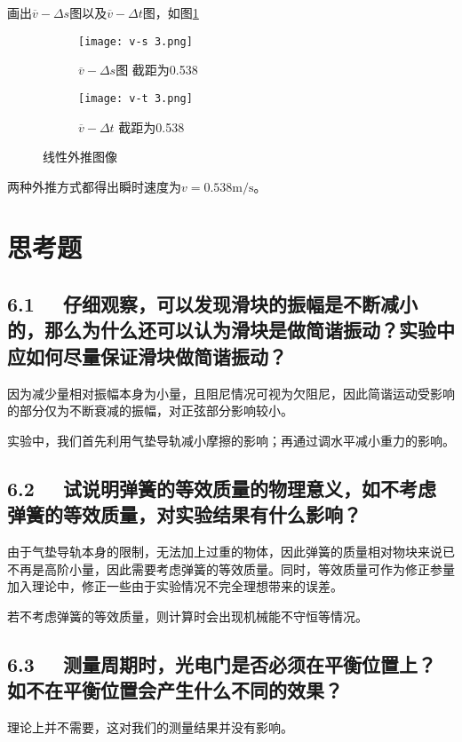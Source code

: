 \documentclass[11pt]{article}
\begin{document}
	画出$\overline{v}-\Delta s$图以及$\overline{v}-\Delta t$图，如图\ref{fig:v3}
	\begin{figure}[H]
		\centering
		\begin{subfigure}[t]{0.45\textwidth}  %
			\centering
			\texttt{[image: v-s 3.png]}  %
			\caption{$\overline{v}-\Delta s$图 \quad 截距为0.538}
		\end{subfigure}
		\begin{subfigure}[t]{0.45\textwidth}  %
			\centering
			\texttt{[image: v-t 3.png]}  %
			\caption{$\overline{v}-\Delta t$ \quad 截距为0.538}
		\end{subfigure}
		\caption{线性外推图像}
		\label{fig:v3}
	\end{figure}
	
	两种外推方式都得出瞬时速度为$v=0.538 \mathrm{m/s}$。
	
	\section{思考题}
	
	\subsection*{6.1 \ \  仔细观察，可以发现滑块的振幅是不断减小的，那么为什么还可以认为滑块是做简谐振动？实验中应如何尽量保证滑块做简谐振动？}
	因为减少量相对振幅本身为小量，且阻尼情况可视为欠阻尼，因此简谐运动受影响的部分仅为不断衰减的振幅，对正弦部分影响较小。
	
	实验中，我们首先利用气垫导轨减小摩擦的影响；再通过调水平减小重力的影响。
	
	\subsection*{6.2 \ \  试说明弹簧的等效质量的物理意义，如不考虑弹簧的等效质量，对实验结果有什么影响？}
	
	由于气垫导轨本身的限制，无法加上过重的物体，因此弹簧的质量相对物块来说已不再是高阶小量，因此需要考虑弹簧的等效质量。同时，等效质量可作为修正参量加入理论中，修正一些由于实验情况不完全理想带来的误差。
	
	若不考虑弹簧的等效质量，则计算时会出现机械能不守恒等情况。
	
	
	\subsection*{6.3 \ \  测量周期时，光电门是否必须在平衡位置上？如不在平衡位置会产生什么不同的效果？}
	理论上并不需要，这对我们的测量结果并没有影响。
	
\end{document}
